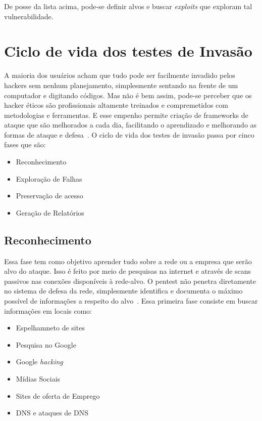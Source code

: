 De posse da lista acima, pode-se definir alvos e buscar \emph{exploits} que exploram tal vulnerabilidade.

\section{Ciclo de vida dos testes de Invasão}

A maioria dos usuários acham que tudo pode ser facilmente invadido pelos hackers sem nenhum planejamento, simplesmente sentando na frente de um computador e digitando códigos. Mas não é bem assim, pode-se perceber que os hacker éticos são profissionais altamente treinados e compremetidos com metodologias e ferramentas. E esse empenho permite criação de frameworks de ataque que são melhorados a cada dia, facilitando o aprendizado e melhorando as formas de ataque e defesa~\cite{broad}. 
O ciclo de vida dos testes de invasão passa por cinco fases que são:
\begin{itemize}
\item Reconhecimento
\item Exploração de Falhas
\item Preservação de acesso
\item Geração de Relatórios
\end{itemize}



\subsection{Reconhecimento}
Essa fase tem como objetivo aprender tudo sobre a rede ou a empresa que serão alvo do ataque. Isso é feito por meio de pesquisas na internet e através de scans passivos nas conexões disponíveis à rede-alvo. O pentest não penetra diretamente no sistema de defesa da rede, simplesmente identifica e documenta o máximo possível de informações a respeito do alvo~\cite{broad}.
Essa primeira fase consiste em buscar informações em locais como:
\begin{itemize}
\item Espelhamneto de sites
\item Pesquisa no Google
\item Google \emph{hacking}
\item Mídias Sociais
\item Sites de oferta de Emprego
\item DNS e ataques de DNS

\end{itemize}


